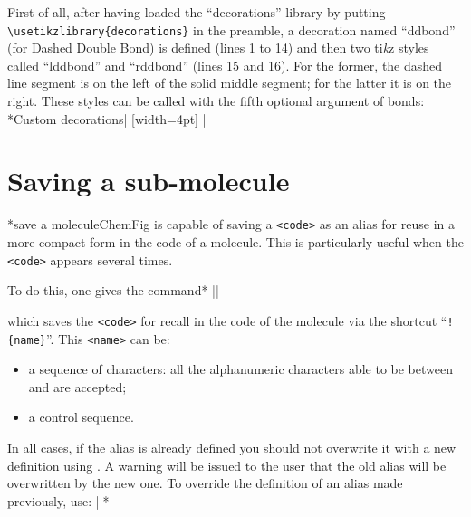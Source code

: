 \documentclass[10pt]{article}
\makeatletter
\newcommand\idx{\@ifstar{\let\print@or@not\@gobble\idx@}{\let\print@or@not\@firstofone\idx@}}
\newcommand\idx@[1]{%
	\ifcat\expandafter\noexpand\@car#1\@nil\relax%
		\expandafter\ifx\@car#1\@nil\protect
			\index{#1}%
			\print@or@not{#1}%
		\else
			\saveexpandmode\expandarg
			\StrSubstitute{\string#1}{\string @}{\@empty\protect\symbol{'100}}[\temp@]%
			\StrGobbleLeft\temp@1[\temp@]%
			\restoreexpandmode
			\expandafter\index\expandafter{\temp@ @\protect\texttt{\protect\textbackslash\temp@}}%
			\print@or@not{\texttt{\string#1}}%
		\fi
	\else
		\index{#1}%
		\print@or@not{#1}%
	\fi
}
\newcommand\make@car@active[2]{%
	\catcode`#1\active
	\begingroup
		\lccode`\~`#1\relax
		\lowercase{\endgroup\def~{#2}}%
}
\newif\if@exstar
\newcommand\exemple{%
	\begingroup
	\parskip\z@
	\@makeother\;\@makeother\!\@makeother\?\@makeother\:%
	\@ifstar{\@exstartrue\exemple@}{\@exstarfalse\exemple@}}
\newcommand\exemple@[2][65]{%
	\medbreak\noindent
	\begingroup
		\let\do\@makeother\dospecials
		\make@car@active\ { {}}%
		\make@car@active\^^M{\par\leavevmode}%
		\make@car@active\,{\leavevmode\kern\z@\string,}%
		\make@car@active\-{\leavevmode\kern\z@\string-}%
		\make@car@active\>{\leavevmode\kern\z@\string>}%
		\make@car@active\<{\leavevmode\kern\z@\string<}%
		\exemple@@{#1}{#2}%
}
\newcommand\exemple@@[3]{%
	\def\@tempa##1#3{\exemple@@@{#1}{#2}{##1}}%
	\@tempa
}
\newcommand\exemple@@@[3]{%
	\xdef\the@code{#3}%
	\endgroup
	\if@exstar
		\begingroup
			\fboxrule0.4pt
			\let\breakboxparindent\z@
			\def\bkvz@bottom{\hrule\@height\fboxrule}%
			\let\bkvz@before@breakbox\relax
			\def\bkvz@set@linewidth{\advance\linewidth\dimexpr-2\fboxrule-2\fboxsep}%
			\def\bkvz@left{\vrule\@width\fboxrule\hskip\fboxsep}%
			\def\bkvz@right{\hskip\fboxsep\vrule\@width\fboxrule}%
			\def\bkvz@top{\hbox to \hsize{%
				\vrule\@width\fboxrule\@height\fboxrule
				\leaders\bkvz@bottom\hfill
				\ECFAugie
				\fboxsep\z@
				\colorbox{black}{\kern0.25em\color{white}\footnotesize\lower0.5ex\hbox{\strut#2}\kern0.25em}%
				\leaders\bkvz@bottom\hfill
				\vrule\@width\fboxrule\@height\fboxrule}}%
			\breakbox
				\kern.5ex\relax
				\ttfamily\footnotesize\the@code\par
				\normalfont
				\kern3pt
				\hrule height0.1pt width\linewidth depth0.1pt
				\vskip5pt
				\rightskip0pt plus 1fill
				\everypar{{\color{lightgray}\rlap{\vrule height0.1pt width\linewidth depth0.1pt}}\hskip0pt plus 1fill}%
				\newlinechar`\^^M\everyeof{\noexpand}\scantokens{#3}\par
			\endbreakbox
		\endgroup
	\else
		\vskip0.5ex
		\boxput*(0,1)
			{\fboxsep\z@
			\hbox{\ECFAugie\colorbox{black}{\leavevmode\kern0.25em{\color{white}\footnotesize\strut#2}\kern0.25em}}%
			}%
			{\fboxsep5pt
			\fbox{%
				$\vcenter{\hsize\dimexpr0.#1\linewidth-\fboxsep-\fboxrule\relax
					\kern5pt\parskip0pt \ttfamily\footnotesize\the@code}%
				\vcenter{\kern5pt\hsize\dimexpr\linewidth-0.#1\linewidth-\fboxsep-\fboxrule\relax
					\everypar{{\color{lightgray}\rlap{\vrule height0.1pt width\dimexpr\linewidth-0.#1\linewidth-\fboxsep-\fboxrule depth0.1pt}}}%
					\footnotesize\newlinechar`\^^M\everyeof{\noexpand}\scantokens{#3}}$%
				}%
			}%
	\fi
	\medbreak
	\endgroup
}
\let\do\@makeother\dospecials
\newcommand\CF{{\ECFAugie ChemFig}\xspace}
\newcommand\TIKZ{ti\textit kz\xspace}
\makeatother
\begin{document}
First of all, after having loaded the ``decorations'' library by putting \verb-\usetikzlibrary{decorations}- in the preamble, a decoration named ``ddbond'' (for Dashed Double Bond) is defined (lines 1 to 14) and then two \TIKZ styles called ``lddbond'' and ``rddbond'' (lines 15 and 16). For the former, the dashed line segment is on the left of the solid middle segment; for the latter it is on the right. These styles can be called with the fifth optional argument of bonds:
\exemple*{Custom decorations}|
{
  [width=4pt]
  {
    \pgfpathlineto{\pgfpoint{4pt}{0pt}}
    \pgfpathmoveto{\pgfpoint{2pt}{2pt}}
    \pgfpathlineto{\pgfpoint{4pt}{2pt}}
    \pgfpathmoveto{\pgfpoint{4pt}{0pt}}
  }
  {
    \pgfpathlineto{\pgfpointdecoratedpathlast}
  }
}
\setatomsep{4em}
|

\section{Saving a sub-molecule}\label{definesubmol}
\idx*{save a molecule}\CF is capable of saving a \verb-<code>- as an alias for reuse in a more compact form in the code of a molecule. This is particularly useful when the \verb-<code>- appears several times.

To do this, one gives the command\idx*{}
\centerverb||
\smallskip

which saves the \verb/<code>/ for recall in the code of the molecule via the shortcut ``\verb/!{name}/''. This \verb-<name>- can be:
\begin{itemize}
	\item a sequence of characters: all the alphanumeric characters able to be between \texttt{\string\csname} and \texttt{\string\endcsname} are accepted;
	\item a control sequence.
\end{itemize}

In all cases, if the alias is already defined you should not overwrite it with a new definition using \idx{\definesubmol}. A warning will be issued to the user that the old alias will be overwritten by the new one. To override the definition of an alias made previously, use:\label{redefinesubmol}
\centerverb||\idx*{\redefinesubmol}
\smallskip
\end{document}
